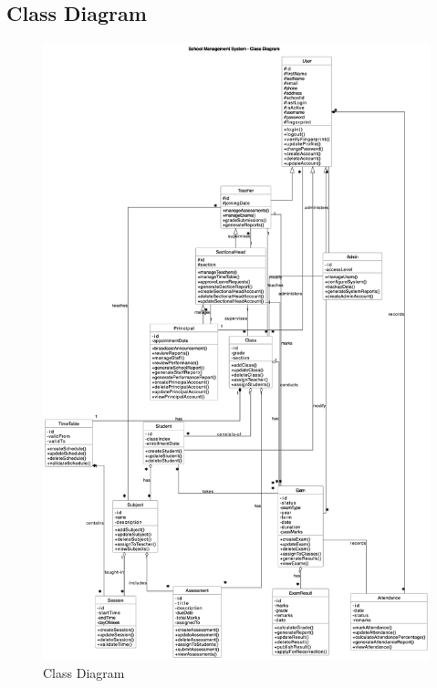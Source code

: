 \documentclass[12pt,a4paper]{report}
\begin{document}
\subsection{Class Diagram}
\begin{figure}[htbp]
    \centering
    \includegraphics[width=1\textwidth]{class-diagram.png}
    \caption{Class Diagram}
    \label{fig:class-diagram}
\end{figure}
\end{document}
